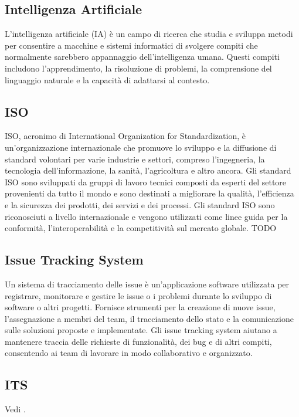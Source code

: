 \vspace{2em}
\subsection*{Intelligenza Artificiale}
L'intelligenza artificiale (IA) è un campo di ricerca che studia e sviluppa metodi per consentire a macchine e sistemi informatici di svolgere compiti che normalmente sarebbero appannaggio dell'intelligenza umana. Questi compiti includono l'apprendimento, la risoluzione di problemi, la comprensione del linguaggio naturale e la capacità di adattarsi al contesto.

\vspace{2em}
\subsection*{ISO}
ISO, acronimo di International Organization for Standardization, è un'organizzazione internazionale che promuove lo sviluppo e la diffusione di standard volontari per varie industrie e settori, compreso l'ingegneria, la tecnologia dell'informazione, la sanità, l'agricoltura e altro ancora. Gli standard ISO sono sviluppati da gruppi di lavoro tecnici composti da esperti del settore provenienti da tutto il mondo e sono destinati a migliorare la qualità, l'efficienza e la sicurezza dei prodotti, dei servizi e dei processi. Gli standard ISO sono riconosciuti a livello internazionale e vengono utilizzati come linee guida per la conformità, l'interoperabilità e la competitività sul mercato globale.
TODO

\vspace{2em}
\subsection*{Issue Tracking System}
Un sistema di tracciamento delle issue è un'applicazione software utilizzata per registrare, monitorare e gestire le issue o i problemi durante lo sviluppo di software o altri progetti. Fornisce strumenti per la creazione di nuove issue, l'assegnazione a membri del team, il tracciamento dello stato e la comunicazione sulle soluzioni proposte e implementate. Gli issue tracking system aiutano a mantenere traccia delle richieste di funzionalità, dei bug e di altri compiti, consentendo ai team di lavorare in modo collaborativo e organizzato.

\vspace{2em}
\subsection*{ITS}
\par Vedi .
